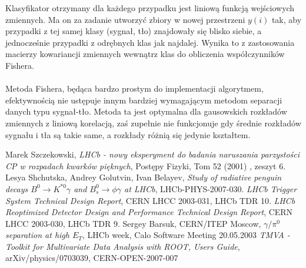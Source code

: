 \documentclass{pracamgr}
\begin{document}
\noindent
Klasyfikator otrzymany dla każdego przypadku jest liniową funkcją wejściowych zmiennych. Ma on za zadanie utworzyć zbiory w nowej przestrzeni $y(i)$ tak, aby przypadki z tej samej klasy (sygnał, tło) znajdowały się blisko siebie, a jednocześnie przypadki z odrębnych klas jak najdalej. Wynika to z zastosowania macierzy kowariancji zmiennych wewnątrz klas do obliczenia współczynników Fishera.
\\\\
\noindent
Metoda Fishera, będąca bardzo prostym do implementacji algorytmem, efektywnością nie ustępuje innym bardziej wymagającym metodom separacji danych typu sygnał-tło. Metoda ta jest optymalna dla gausowskich rozkładów zmiennych z liniową korelacją, zaś zupełnie nie funkcjonuje gdy średnie rozkładów sygnału i tła są takie same, a rozkłady różnią się jedynie kształtem.


\begin{thebibliography}{99}

 Marek Szczekowski, \textit{LHCb - nowy eksperyment do badania naruszania parzystości CP w rozpadach kwarków pięknych}, Postępy Fizyki, Tom 52 (2001) , zeszyt 6.
 Lesya Shchutska, Andrey Golutvin, Ivan Belayev, \textit{Study of radiative penguin decays $B^{0}\rightarrow K^{*0}\gamma$ and $B^{0}_{s}\rightarrow \phi\gamma$ at LHCb}, LHCb-PHYS-2007-030.
 \textit{LHCb Trigger System Technical Design Report}, CERN LHCC 2003-031, LHCb TDR 10.
 \textit{LHCb Reoptimized Detector Design and Performance Technical Design Report}, CERN LHCC 2003-030, LHCb TDR 9.
 Sergey Barsuk, CERN/ITEP Moscow, \textit{$\gamma/\pi^0$ separation at high $E_T$}, LHCb week, Calo Software Meeting 20.05.2003
 \textit{TMVA - Toolkit for Multivariate Data Analysis with ROOT, Users Guide}, arXiv/physics/0703039, CERN-OPEN-2007-007
\end{thebibliography}
\end{document}
